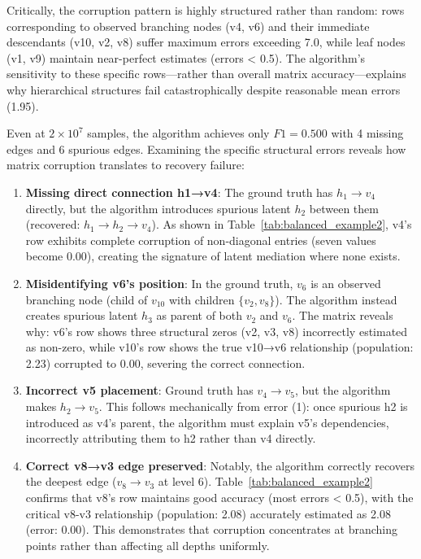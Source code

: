 \documentclass[11pt,a4paper]{article}
\numberwithin{equation}{section}
\begin{document}
Critically, the corruption pattern is highly structured rather than random: rows corresponding to observed branching nodes (v4, v6) and their immediate descendants (v10, v2, v8) suffer maximum errors exceeding 7.0, while leaf nodes (v1, v9) maintain near-perfect estimates (errors < 0.5). The algorithm's sensitivity to these specific rows—rather than overall matrix accuracy—explains why hierarchical structures fail catastrophically despite reasonable mean errors (1.95).

Even at $2 \times 10^7$ samples, the algorithm achieves only $F1 = 0.500$ with 4 missing edges and 6 spurious edges. Examining the specific structural errors reveals how matrix corruption translates to recovery failure:

\begin{enumerate}[label=(\arabic*)]
\item \textbf{Missing direct connection h1→v4}: The ground truth has $h_1 \to v_4$ directly, but the algorithm introduces spurious latent $h_2$ between them (recovered: $h_1 \to h_2 \to v_4$). As shown in Table~\ref{tab:balanced_example2}, v4's row exhibits complete corruption of non-diagonal entries (seven values become 0.00), creating the signature of latent mediation where none exists.

\item \textbf{Misidentifying v6's position}: In the ground truth, $v_6$ is an observed branching node (child of $v_{10}$ with children $\{v_2, v_8\}$). The algorithm instead creates spurious latent $h_3$ as parent of both $v_2$ and $v_6$. The matrix reveals why: v6's row shows three structural zeros (v2, v3, v8) incorrectly estimated as non-zero, while v10's row shows the true v10→v6 relationship (population: 2.23) corrupted to 0.00, severing the correct connection.

\item \textbf{Incorrect v5 placement}: Ground truth has $v_4 \to v_5$, but the algorithm makes $h_2 \to v_5$. This follows mechanically from error (1): once spurious h2 is introduced as v4's parent, the algorithm must explain v5's dependencies, incorrectly attributing them to h2 rather than v4 directly.

\item \textbf{Correct v8→v3 edge preserved}: Notably, the algorithm correctly recovers the deepest edge ($v_8 \to v_3$ at level 6). Table~\ref{tab:balanced_example2} confirms that v8's row maintains good accuracy (most errors < 0.5), with the critical v8-v3 relationship (population: 2.08) accurately estimated as 2.08 (error: 0.00). This demonstrates that corruption concentrates at branching points rather than affecting all depths uniformly.
\end{enumerate}
\end{document}
